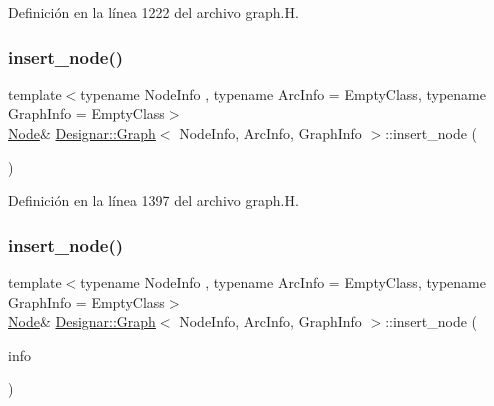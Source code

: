 Definición en la línea 1222 del archivo graph.\+H.

\mbox{\label{class_designar_1_1_graph_a5da24cc7de9ae39b1df684cb75782fed}} 
\subsubsection{\texorpdfstring{insert\+\_\+node()}{insert\_node()}\hspace{0.1cm}{\footnotesize\ttfamily [2/4]}}
{\footnotesize\ttfamily template$<$typename Node\+Info , typename Arc\+Info  = Empty\+Class, typename Graph\+Info  = Empty\+Class$>$ \\
\hyperlink{class_designar_1_1_graph_a5dfc7dba9d092ac489c72e40390c37d0}{Node}\& \hyperlink{class_designar_1_1_graph}{Designar\+::\+Graph}$<$ Node\+Info, Arc\+Info, Graph\+Info $>$\+::insert\+\_\+node (\begin{DoxyParamCaption}{ }\end{DoxyParamCaption})\hspace{0.3cm}{\ttfamily [inline]}}



Definición en la línea 1397 del archivo graph.\+H.

\mbox{\label{class_designar_1_1_graph_a573d7ab63075e30bc8c5aaa2a80548ec}} 
\subsubsection{\texorpdfstring{insert\+\_\+node()}{insert\_node()}\hspace{0.1cm}{\footnotesize\ttfamily [3/4]}}
{\footnotesize\ttfamily template$<$typename Node\+Info , typename Arc\+Info  = Empty\+Class, typename Graph\+Info  = Empty\+Class$>$ \\
\hyperlink{class_designar_1_1_graph_a5dfc7dba9d092ac489c72e40390c37d0}{Node}\& \hyperlink{class_designar_1_1_graph}{Designar\+::\+Graph}$<$ Node\+Info, Arc\+Info, Graph\+Info $>$\+::insert\+\_\+node (\begin{DoxyParamCaption}\item[{const Node\+Info \&}]{info }\end{DoxyParamCaption})\hspace{0.3cm}{\ttfamily [inline]}}




